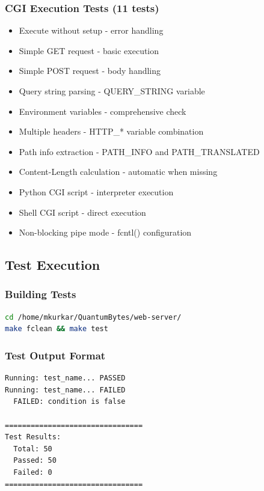 \documentclass[11pt,a4paper]{article}
\begin{document}
\subsubsection{CGI Execution Tests (11 tests)}

\begin{itemize}
    \item Execute without setup - error handling
    \item Simple GET request - basic execution
    \item Simple POST request - body handling
    \item Query string parsing - QUERY\_STRING variable
    \item Environment variables - comprehensive check
    \item Multiple headers - HTTP\_* variable combination
    \item Path info extraction - PATH\_INFO and PATH\_TRANSLATED
    \item Content-Length calculation - automatic when missing
    \item Python CGI script - interpreter execution
    \item Shell CGI script - direct execution
    \item Non-blocking pipe mode - fcntl() configuration
\end{itemize}

\subsection{Test Execution}

\subsubsection{Building Tests}

\begin{lstlisting}[language=bash, caption=Build and Run Tests]
cd /home/mkurkar/QuantumBytes/web-server/
make fclean && make test
\end{lstlisting}

\subsubsection{Test Output Format}

\begin{verbatim}
Running: test_name... PASSED
Running: test_name... FAILED
  FAILED: condition is false

================================
Test Results:
  Total: 50
  Passed: 50
  Failed: 0
================================
\end{verbatim}
\end{document}
